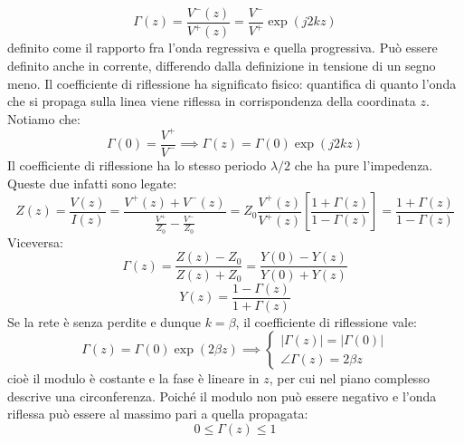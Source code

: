 \documentclass{book}
\begin{document}
        \begin{equation}
            \Gamma (z) = \frac{V^{-}(z)}{V^{+}(z)} = \frac{V^{-}}{V^{+}}\exp(j2kz)
        \end{equation}
        definito come il rapporto fra l'onda regressiva e quella progressiva. Può essere definito anche in corrente, differendo dalla
        definizione in tensione di un segno meno. Il coefficiente di riflessione ha significato fisico: quantifica di quanto l'onda che si 
        propaga sulla linea viene riflessa in corrispondenza della coordinata $z$. Notiamo che:
        \begin{equation}
            \Gamma(0)=\frac{V^{+}}{V^{-}} \implies \Gamma(z) = \Gamma(0)\exp(j2kz)
        \end{equation}
        Il coefficiente di riflessione ha lo stesso periodo $\lambda/2$ che ha pure l'impedenza. Queste due 
        infatti sono legate:
        \begin{equation}
            Z(z)=\frac{V(z)}{I(z)}=\displaystyle \frac{V^{+}(z)+V^{-}(z)}{\displaystyle \frac{V^{+}}{Z_{0}}-\frac{V^{-}}{Z_{0}}}
            = Z_{0}\frac{V^{+}(z)}{V^{+}(z)}[\frac{1+\Gamma(z)}{1-\Gamma(z)}] = \frac{1+\Gamma(z)}{1-\Gamma(z)} 
        \end{equation}
        Viceversa:
        \begin{equation}
            \Gamma(z)=\frac{Z(z)-Z_{0}}{Z(z)+Z_{0}} = \frac{Y(0)-Y(z)}{Y(0)+Y(z)}
        \end{equation}
        \begin{equation}
            Y(z)=\frac{1-\Gamma(z)}{1+\Gamma(z)}
        \end{equation}
        Se la rete è senza perdite e dunque $k=\beta$, il coefficiente di riflessione vale:
        \begin{equation}
            \Gamma (z)=\Gamma (0)\exp(2 \beta z) \implies \begin{cases}
                |\Gamma(z)|=|\Gamma(0)| \\
                \angle \Gamma(z) = 2 \beta z
            \end{cases}
        \end{equation}
        cioè il modulo è costante e la fase è lineare in $z$, per cui nel piano complesso descrive una circonferenza. Poiché 
        il modulo non può essere negativo e l'onda riflessa può essere al massimo pari a quella propagata:
        \begin{equation}
            0 \leq \Gamma(z) \leq 1
        \end{equation}
\end{document}
